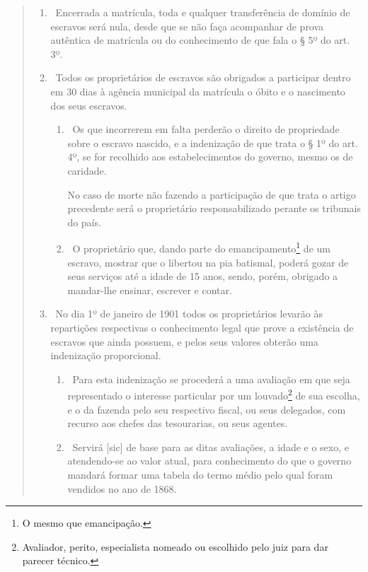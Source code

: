 {\begin{quote}
\begin{enumerate}[label=Art. \arabic*º]
\item\ Encerrada a matrícula, toda e qualquer transferência de domínio
de escravos será nula, desde que se não faça acompanhar de prova
autêntica de matrícula ou do conhecimento de que fala o § 5º do art.
3º.

\item\ Todos os proprietários de escravos são obrigados a participar
dentro em 30 dias à agência municipal da matrícula o óbito e o
nascimento dos seus escravos.

\begin{enumerate}[label=§ \arabic*º]
\item\ Os que incorrerem em falta perderão o direito de propriedade sobre
o escravo nascido, e a indenização de que trata o § 1º do art. 4º, se
for recolhido aos estabelecimentos do governo, mesmo os de caridade.

No caso de morte não fazendo a participação de que trata o artigo
precedente será o proprietário responsabilizado perante os tribunais do
país.

\item\ O proprietário que, dando parte do emancipamento\footnote{O
  mesmo que emancipação.} de um escravo, mostrar que o libertou na pia
batismal, poderá gozar de seus serviços até a idade de 15 anos, sendo,
porém, obrigado a mandar-lhe ensinar, escrever e contar.
\end{enumerate}

\item\ No dia 1º de janeiro de 1901 todos os proprietários levarão às
repartições respectivas o conhecimento legal que prove a existência de
escravos que ainda possuem, e pelos seus valores obterão uma indenização
proporcional.

\begin{enumerate}[label=§ \arabic*º]
\item\ Para esta indenização se procederá a uma avaliação em que seja
representado o interesse particular por um louvado\footnote{Avaliador,
  perito, especialista nomeado ou escolhido pelo juiz para dar parecer
  técnico.} de sua escolha, e o da fazenda pelo seu respectivo fiscal,
ou seus delegados, com recurso aos chefes das tesourarias, ou seus
agentes.

\item\ Servirá {[}sic{]} de base para as ditas avaliações, a idade e o
sexo, e atendendo-se ao valor atual, para conhecimento do que o governo
mandará formar uma tabela do termo médio pelo qual foram vendidos no ano
de 1868.


\end{enumerate}
\end{enumerate}
\end{quote}}
